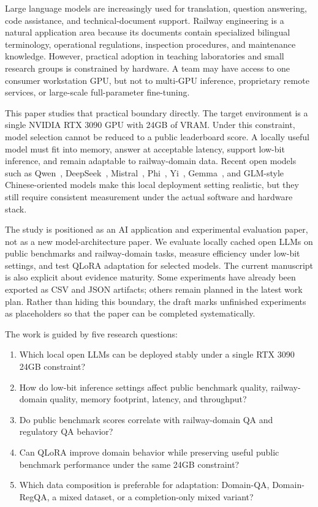 Large language models are increasingly used for translation, question
answering, code assistance, and technical-document support. Railway engineering
is a natural application area because its documents contain specialized
bilingual terminology, operational regulations, inspection procedures, and
maintenance knowledge. However, practical adoption in teaching laboratories and
small research groups is constrained by hardware. A team may have access to one
consumer workstation GPU, but not to multi-GPU inference, proprietary remote
services, or large-scale full-parameter fine-tuning.

This paper studies that practical boundary directly. The target environment is
a single NVIDIA RTX 3090 GPU with 24GB of VRAM. Under this constraint, model
selection cannot be reduced to a public leaderboard score. A locally useful
model must fit into memory, answer at acceptable latency, support low-bit
inference, and remain adaptable to railway-domain data. Recent open models such
as Qwen~\cite{qwen3,qwen25}, DeepSeek~\cite{deepseekllm,deepseekr1},
Mistral~\cite{mistral7b}, Phi~\cite{phi3}, Yi~\cite{yi2024open},
Gemma~\cite{gemma2024open,gemma2,gemma3}, and GLM-style Chinese-oriented
models make this local deployment setting realistic, but they still require
consistent measurement under the actual software and hardware stack.

The study is positioned as an AI application and experimental evaluation paper,
not as a new model-architecture paper. We evaluate locally cached open LLMs on
public benchmarks and railway-domain tasks, measure efficiency under low-bit
settings, and test QLoRA adaptation for selected models. The current
manuscript is also explicit about evidence maturity. Some experiments have
already been exported as CSV and JSON artifacts; others remain planned in the
latest work plan. Rather than hiding this boundary, the draft marks unfinished
experiments as placeholders so that the paper can be completed systematically.

The work is guided by five research questions:
\begin{enumerate}[leftmargin=1.5em]
  \item Which local open LLMs can be deployed stably under a single RTX 3090
  24GB constraint?
  \item How do low-bit inference settings affect public benchmark quality,
  railway-domain quality, memory footprint, latency, and throughput?
  \item Do public benchmark scores correlate with railway-domain QA and
  regulatory QA behavior?
  \item Can QLoRA improve domain behavior while preserving useful public
  benchmark performance under the same 24GB constraint?
  \item Which data composition is preferable for adaptation: Domain-QA,
  Domain-RegQA, a mixed dataset, or a completion-only mixed variant?
\end{enumerate}

